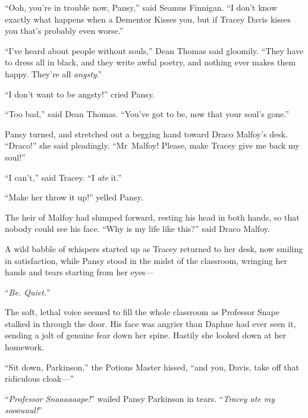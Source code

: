 “Ooh, you’re in trouble now, Pansy,” said Seamus Finnigan. “I don’t know exactly what happens when a Dementor Kisses you, but if Tracey Davis kisses you that’s probably even worse.”

“I’ve heard about people without souls,” Dean Thomas said gloomily. “They have to dress all in black, and they write awful poetry, and nothing ever makes them happy. They’re all \emph{angsty}.”

“I don’t want to be angsty!” cried Pansy.

“Too bad,” said Dean Thomas. “You’ve got to be, now that your soul’s gone.”

Pansy turned, and stretched out a begging hand toward Draco Malfoy’s desk. “Draco!” she said pleadingly. “Mr~Malfoy! Please, make Tracey give me back my soul!”

“I can’t,” said Tracey. “I \emph{ate} it.”

“Make her throw it up!” yelled Pansy.

The heir of Malfoy had slumped forward, resting his head in both hands, so that nobody could see his face. “Why is my life like this?” said Draco Malfoy.

A wild babble of whispers started up as Tracey returned to her desk, now smiling in satisfaction, while Pansy stood in the midst of the classroom, wringing her hands and tears starting from her eyes—

“\emph{Be. Quiet.}”

The soft, lethal voice seemed to fill the whole classroom as Professor Snape stalked in through the door. His face was angrier than Daphne had ever seen it, sending a jolt of genuine fear down her spine. Hastily she looked down at her homework.

“Sit down, Parkinson,” the Potions Master hissed, “and you, Davis, take off that ridiculous cloak—”

“\emph{Professor Snaaaaaape!}” wailed Pansy Parkinson in tears. “\emph{Tracey ate my sooouuul!}”
